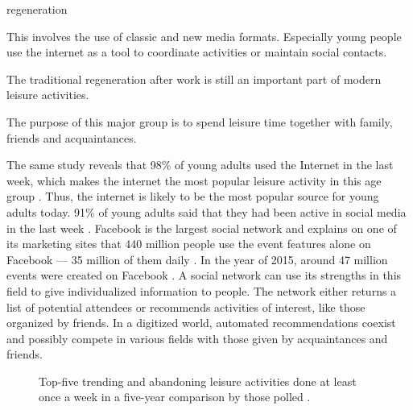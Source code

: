 \documentclass[12pt,numbers=noenddot,parskip,bibliography=totocnumbered,listof=totocnumbered,draft]{scrreprt}
\begin{document}
\begin{labeling}{regeneration}
\item[media use] This involves the use of classic and new media formats. Especially young people use the internet as a tool to coordinate activities or maintain social contacts.
\item[regeneration] The traditional regeneration after work is still an important part of modern leisure activities.
\item[socialize] The purpose of this major group is to spend leisure time together with family, friends and acquaintances.
\end{labeling}

The same study reveals that 98\% of young adults used the Internet in the last week, which makes the internet the most popular leisure activity in this age group \citep{freizeitmonitor2016}. Thus, the internet is likely to be the most popular source for young adults today. 91\% of young adults said that they had been active in social media in the last week \cite{freizeitmonitor2016}. Facebook is the largest social network and explains on one of its marketing sites that 440 million people use the event features alone on Facebook — 35 million of them daily \citep{facebook2017}. In the year of 2015, around 47 million events were created on Facebook \citep{facebook2017}. A social network can use its strengths in this field to give individualized information to people. The network either returns a list of potential attendees or recommends activities of interest, like those organized by friends. In a digitized world, automated recommendations coexist and possibly compete in various fields with those given by acquaintances and friends.

\begin{figure}
\caption[Trending and abondoning leisure activities]{Top-five trending and abandoning leisure activities done at least once a week in a five-year comparison by those polled \citep{freizeitmonitor2016}.}
\label{topfivechangingleisureactivities}
\end{figure}
\end{document}
